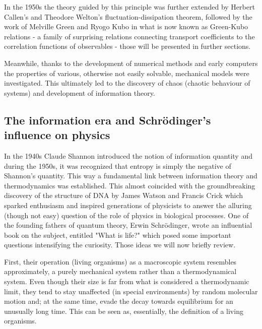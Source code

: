 \documentclass[a4paper,12pt]{article}
\begin{document}
In the 1950s the theory guided by this principle was further extended by  Herbert Callen's and Theodore Welton's fluctuation-dissipation theorem, followed by the work of Melville Green and Ryogo Kubo in what is now known as Green-Kubo relations \cite{Kubo:1957cl} - a family of surprising relations connecting transport coefficients to the correlation functions of observables - those will be presented in further sections. 

Meanwhile, thanks to the development of numerical methods and early computers the properties of various, otherwise not easily solvable, mechanical models were investigated.
This ultimately led to the discovery of chaos (chaotic behaviour of systems) and development of information theory.

\subsection{The information era and Schrödinger's influence on physics}
\label{SchrodingersInfluence}

In the 1940s Claude Shannon introduced the notion of information quantity \cite{Shannon:429164} and during the 1950s, it was recognized that entropy is simply the negative of Shannon's quantity. This way a fundamental link between information theory and thermodynamics was established. This almost coincided with the groundbreaking discovery of the structure of DNA by James Watson and Francis Crick which sparked enthusiasm and inspired generations of physicists to answer the alluring (though not easy) question of the role of physics in biological processes.
One of the founding fathers of quantum theory, Erwin Schrödinger, wrote an influential book on the subject, entitled "What is life?" \cite{Schrodinger:2005wk} which  posed some important questions intensifying the curiosity. Those ideas we will now briefly review.


First, their operation (living organisms) as a macroscopic system resembles approximately, a purely mechanical system rather than a thermodynamical system. 
Even though their size is far from what is considered a thermodynamic limit, they tend to stay unaffected (in special environments) by random molecular motion and; at the same time, evade the decay towards equilibrium for an unusually long time. This can be seen as, essentially, the definition of a living organisms.
\end{document}

